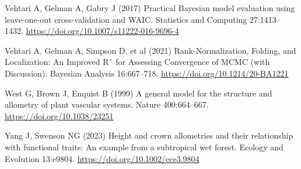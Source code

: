 \documentclass[
  12pt,
  letterpaper,
  DIV=11,
  numbers=noendperiod]{scrartcl}
\newlength{\cslhangindent}
\newenvironment{CSLReferences}[2] %
 {\begin{list}{}{%
  \setlength{\itemindent}{0pt}
  \setlength{\leftmargin}{0pt}
  \setlength{\parsep}{0pt}
  \ifodd #1
   \setlength{\leftmargin}{\cslhangindent}
   \setlength{\itemindent}{-1\cslhangindent}
  \fi
  \setlength{\itemsep}{#2\baselineskip}}}
 {\end{list}}
\begin{document}
\begin{CSLReferences}{1}{1}
Vehtari A, Gelman A, Gabry J (2017) Practical {Bayesian} model
evaluation using leave-one-out cross-validation and {WAIC}. Statistics
and Computing 27:1413--1432.
\url{https://doi.org/10.1007/s11222-016-9696-4}

Vehtari A, Gelman A, Simpson D, et al (2021) Rank-{Normalization},
{Folding}, and {Localization}: {An} {Improved} {Rˆ} for {Assessing}
{Convergence} of {MCMC} (with {Discussion}). Bayesian Analysis
16:667--718. \url{https://doi.org/10.1214/20-BA1221}

West G, Brown J, Enquist B (1999) A general model for the structure and
allometry of plant vascular systems. Nature 400:664--667.
\url{https://doi.org/10.1038/23251}

Yang J, Swenson NG (2023) Height and crown allometries and their
relationship with functional traits: {An} example from a subtropical wet
forest. Ecology and Evolution 13:e9804.
\url{https://doi.org/10.1002/ece3.9804}

\end{CSLReferences}
\end{document}
